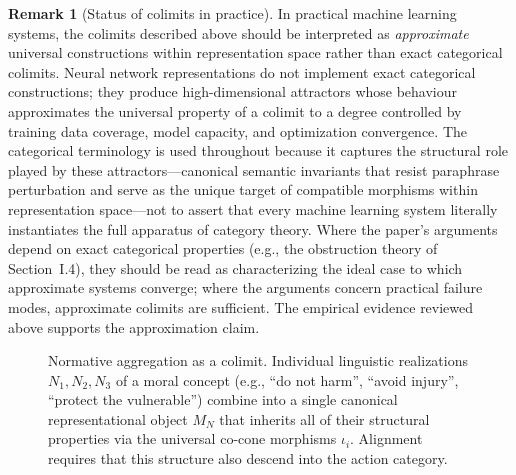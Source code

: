 \documentclass[12pt]{article}
\theoremstyle{definition}
\newtheorem{remark}[theorem]{Remark}
\begin{document}
\begin{remark}[Status of colimits in practice]
\label{rem:approx}
In practical machine learning systems, the colimits described above should be
interpreted as \emph{approximate} universal constructions within representation
space rather than exact categorical colimits. Neural network representations do
not implement exact categorical constructions; they produce high-dimensional
attractors whose behaviour approximates the universal property of a colimit to
a degree controlled by training data coverage, model capacity, and optimization
convergence. The categorical terminology is used throughout because it captures
the structural role played by these attractors---canonical semantic invariants
that resist paraphrase perturbation and serve as the unique target of compatible
morphisms within representation space---not to assert that every machine
learning system literally instantiates the full apparatus of category theory.
Where the paper's arguments depend on exact categorical properties (e.g., the
obstruction theory of Section~I.4), they should be read as characterizing the
ideal case to which approximate systems converge; where the arguments concern
practical failure modes, approximate colimits are sufficient. The empirical
evidence reviewed above supports the approximation claim.
\end{remark}

\begin{figure}[h]
\centering
{}
\caption{Normative aggregation as a colimit. Individual linguistic
realizations $N_1, N_2, N_3$ of a moral concept (e.g., ``do not harm'',
``avoid injury'', ``protect the vulnerable'') combine into a single
canonical representational object $M_N$ that inherits all of their
structural properties via the universal co-cone morphisms $\iota_i$.
Alignment requires that this structure also descend into the action
category.}
\label{fig:colimit}
\end{figure}
\end{document}

